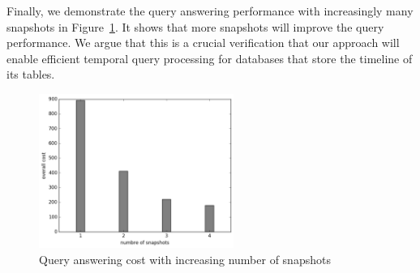 Finally, we demonstrate the query answering performance with increasingly many
snapshots in Figure~\ref{fig:cost-multi}.  It shows that more snapshots will
improve the query performance.  We argue that this is a crucial verification
that our approach will enable efficient temporal query processing for databases
that store the timeline of its tables.

\begin{figure}[tb]
    \label{fig:cost-multi}
    \centering
    \includegraphics[width=2.5in]{figs/snap_cost.pdf}
    \caption{Query answering cost with increasing number of snapshots}
\end{figure}
